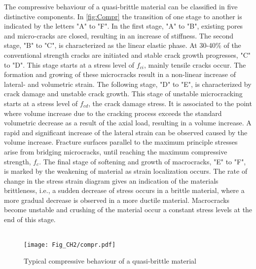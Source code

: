 The compressive behaviour of a quasi-brittle material can be classified in five distinctive components. In \autoref{fig:Compr} the transition of one stage to another is indicated by the letters "A" to "F". In the first stage, "A" to "B", existing pores and micro-cracks are closed, resulting in an increase of stiffness. The second stage, "B" to "C", is characterized as the linear elastic phase. At 30-40\% of the conventional strength cracks are initiated and stable crack growth progresses, "C" to "D". This stage starts at a stress level of $f_{ci}$, mainly tensile cracks occur. The formation and growing of these microcracks result in a non-linear increase of lateral- and volumetric strain. The following stage, "D" to "E", is characterized by crack damage and unstable crack growth. This stage of unstable microcracking starts at a stress level of $f_{cd}$, the crack damage stress. It is associated to the point where volume increase due to the cracking process exceeds the standard volumetric decrease as a result of the axial load, resulting in a volume increase. A rapid and significant increase of the lateral strain can be observed caused by the volume increase. Fracture surfaces parallel to the maximum principle stresses arise from bridging microcracks, until reaching the maximum compressive strength, $f_{c}$. The final stage of softening and growth of macrocracks, "E" to "F", is marked by the weakening of material as strain localization occurs. The rate of change in the stress strain diagram gives an indication of the materials brittleness, i.e., a sudden decrease of stress occurs in a brittle material, where a more gradual decrease is observed in a more ductile material. Macrocracks become unstable and crushing of the material occur a constant stress levels at the end of this stage.\\
\\

\begin{figure}[!htb]
    \centering
    \texttt{[image: Fig\_CH2/compr.pdf]}
    \caption{Typical compressive behaviour of a quasi-brittle material \cite{bakeer2009collapse}}
    \label{fig:Compr}
\end{figure}

